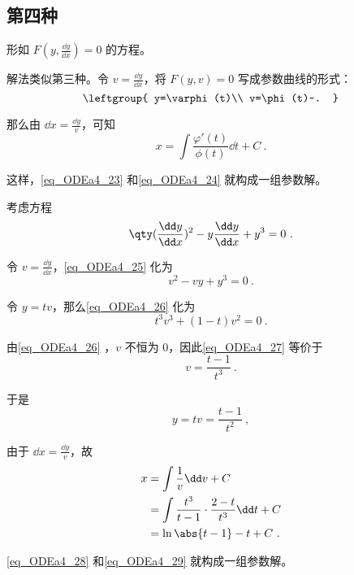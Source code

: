 \subsection{第四种}

形如 $F(y, \frac{\dd y}{\dd x})=0$ 的方程。

解法类似第三种。令 $v=\frac{\dd y}{\dd x}$，将 $F(y, v)=0$ 写成参数曲线的形式：
\begin{equation}\label{eq_ODEa4_23}
\leftgroup{
    y=\varphi(t)\\
    v=\phi(t)~.
}
\end{equation}

那么由 $\dd x=\frac{\dd y}{v}$，可知
\begin{equation}\label{eq_ODEa4_24}
x=\int \frac{\varphi'(t)}{\phi(t)}\dd t+C~.
\end{equation}

这样，\autoref{eq_ODEa4_23} 和\autoref{eq_ODEa4_24} 就构成一组参数解。

\begin{example}{}
考虑方程
\begin{equation}\label{eq_ODEa4_25}
\qty(\frac{\dd y}{\dd x})^2-y\frac{\dd y}{\dd x}+y^3=0~.
\end{equation}

令 $v=\frac{\dd y}{\dd x}$，\autoref{eq_ODEa4_25} 化为
\begin{equation}\label{eq_ODEa4_26}
v^2-vy+y^3=0~.
\end{equation}

令 $y=tv$，那么\autoref{eq_ODEa4_26} 化为
\begin{equation}\label{eq_ODEa4_27}
t^3v^3+(1-t)v^2=0~.
\end{equation}

由\autoref{eq_ODEa4_26} ，$v$ 不恒为 $0$，因此\autoref{eq_ODEa4_27} 等价于
\begin{equation}
v=\frac{t-1}{t^3}~.
\end{equation}

于是
\begin{equation}\label{eq_ODEa4_28}
y=tv=\frac{t-1}{t^2}~,
\end{equation}

由于 $\dd x=\frac{\dd y}{v}$，故
\begin{equation}\label{eq_ODEa4_29}
\begin{aligned}
x
&=\int \frac{1}{v} \dd v+C\\
&=\int \frac{t^3}{t-1}\cdot\frac{2-t}{t^3}\dd t+C\\
&=\ln\abs{t-1}-t+C~.
\end{aligned}
\end{equation}

\autoref{eq_ODEa4_28} 和\autoref{eq_ODEa4_29} 就构成一组参数解。








\end{example}











